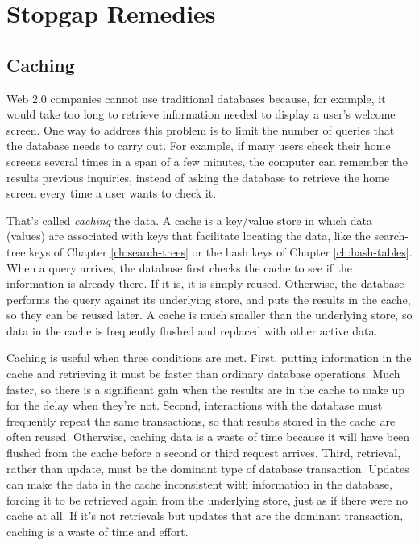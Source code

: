 \section{Stopgap Remedies}

\subsection{Caching}

Web 2.0 companies cannot use traditional databases
because, for example, it would take too long to retrieve information needed
to display a user's welcome screen.
One way to address this problem is to limit the number of queries that the
database needs to carry out.
For example, if many users check their home screens
several times in a span of a few minutes,
the computer can remember the results previous inquiries,
instead of asking the database to
retrieve the home screen every time a user wants to check it.

That's called \emph{caching} the data.
A cache is a key/value store
in which data (values) are associated with keys
that facilitate locating the data,
like the search-tree keys of Chapter \ref{ch:search-trees}
or the hash keys of Chapter \ref{ch:hash-tables}.
When a query arrives, the database first checks
the cache to see if the information is already there.
If it is, it is simply reused.
Otherwise, the database performs the query against its underlying store,
and puts the results in the cache, so they can be reused later.
A cache is much smaller than the underlying store,
so data in the cache is frequently flushed and replaced with other active data.

Caching is useful when three conditions are met.
First, putting information in the cache and retrieving it
must be faster than ordinary database operations.
Much faster, so there is a significant gain
when the results are in the cache to make up for the delay when they're not.
Second, interactions with the database must frequently repeat the same transactions,
so that results stored in the cache are often reused.
Otherwise, caching data is a waste of time because it will
have been flushed from the cache before a second or third request arrives.
Third, retrieval,
rather than update, must be the dominant type of database transaction.
Updates can make the data in the cache inconsistent with information in the database,
forcing it to be retrieved again from the underlying store,
just as if there were no cache at all.
If it's not retrievals but updates that are the dominant transaction,
caching is a waste of time and effort.

